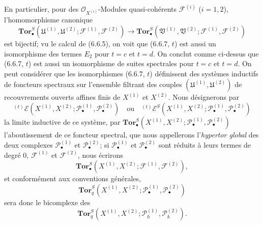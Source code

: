 \begin{env}[6.6.7]
En particulier, pour des $\mathscr O_{X^{(i)}}$-Modules quasi-cohérents
$\mathscr F^{(i)}$ ($i=1,2$), l'homomorphisme canonique
\[
  \mathbf{Tor}_\bullet^S
  (\mathfrak U^{(1)},\mathfrak U^{(2)};
   \mathscr F^{(1)},\mathscr F^{(2)})
  \longrightarrow
  \mathbf{Tor}_\bullet^S
  (\mathfrak V^{(1)},\mathfrak V^{(2)};
   \mathscr F^{(1)},\mathscr F^{(2)})
\]
est bijectif; vu le calcul de (6.6.5), on voit que (6.6.7, $t$) est aussi un
isomorphisme des termes $E_2$ pour $t=c$ et $t=d$. On conclut comme ci-dessus
que (6.6.7, $t$) est aussi un isomorphisme de suites spectrales pour $t=c$ et
$t=d$.
On peut considérer que les isomorphismes (6.6.7, $t$) définissent des systèmes
inductifs de foncteurs spectraux sur l'ensemble filtrant des couples
$(\mathfrak U^{(1)},\mathfrak U^{(2)})$ de recouvrements ouverts affines finis
de $X^{(1)}$ et $X^{(2)}$. Nous désignerons par
\[
  {}^{(t)}\mathscr E
  (X^{(1)},X^{(2)};
   \mathscr P_\bullet^{(1)},\mathscr P_\bullet^{(2)})
  \quad\text{ou}\quad
  {}^{(t)}\mathscr E^S
  (X^{(1)},X^{(2)};
   \mathscr P_\bullet^{(1)},\mathscr P_\bullet^{(2)})
\]
la limite inductive de ce système, par
$\mathbf{Tor}_\bullet^S
(X^{(1)},X^{(2)};\mathscr P_\bullet^{(1)},\mathscr P_\bullet^{(2)})$
l'aboutissement de ce foncteur spectral, que nous appellerons l'\emph{hypertor
global} des deux complexes $\mathscr P_\bullet^{(1)}$ et
$\mathscr P_\bullet^{(2)}$; si $\mathscr P_\bullet^{(1)}$ et
$\mathscr P_\bullet^{(2)}$ sont réduits à leurs termes de degré 0,
$\mathscr F^{(1)}$ et $\mathscr F^{(2)}$, nous écrirons
\[
  \mathbf{Tor}_\bullet^S
  (X^{(1)},X^{(2)};\mathscr F^{(1)},\mathscr F^{(2)}),
\]
et conformément aux conventions générales,
\[
  \mathbf{Tor}_q^S
  (X^{(1)},X^{(2)};\mathscr P_\bullet^{(1)},\mathscr P_\bullet^{(2)})
\]
sera donc le bicomplexe des
\[
  \mathbf{Tor}_q^S
  (X^{(1)},X^{(2)};\mathscr P_h^{(1)},\mathscr P_k^{(2)}).
\]
\end{env}


